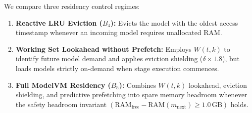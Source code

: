 We compare three residency control regimes:
\begin{enumerate}
    \item \textbf{Reactive LRU Eviction ($B_4$):} Evicts the model with the oldest access timestamp whenever an incoming model requires unallocated RAM.
    \item \textbf{Working Set Lookahead without Prefetch:} Employs $W(t, k)$ to identify future model demand and applies eviction shielding ($\delta \times 1.8$), but loads models strictly on-demand when stage execution commences.
    \item \textbf{Full ModelVM Residency ($B_5$):} Combines $W(t, k)$ lookahead, eviction shielding, and predictive prefetching into spare memory headroom whenever the safety headroom invariant $(\text{RAM}_{\text{free}} - \text{RAM}(m_{\text{next}}) \ge 1.0\,\text{GB})$ holds.
\end{enumerate}

\begin{table}[t]
\small
\centering
\caption{Residency Management Telemetry across Eviction and Prefetching Regimes ($n=10$ matched trials, $\mathcal{B}_{\text{RAM}} = 8.0$\,GB). Values denote mean [bootstrap 95\% CI]. $t_{\text{paging}}$ is cold-load duration; $H_{\text{cache}}$ is cache hit rate; $N_{\text{evict}}$ is total eviction events; $N_{\text{reload}}$ is reload count of previously evicted models; $L$ is total wall-clock execution time.}
\label{tab:exp_h2_residency}
\end{table}

